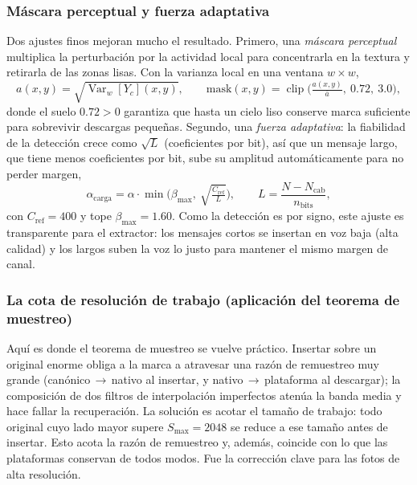 \documentclass[12pt,a4paper]{article}
\begin{document}
\subsubsection*{Máscara perceptual y fuerza adaptativa}
Dos ajustes finos mejoran mucho el resultado. Primero, una \emph{máscara perceptual}
multiplica la perturbación por la actividad local para concentrarla en la textura y
retirarla de las zonas lisas. Con la varianza local en una ventana $w\times w$,
\begin{equation}
a(x,y) = \sqrt{\operatorname{Var}_w[Y_c](x,y)}, \qquad
\mathrm{mask}(x,y) = \operatorname{clip}\!\Big(\tfrac{a(x,y)}{\overline{a}},\ 0{.}72,\ 3{.}0\Big),
\end{equation}
donde el suelo $0{.}72>0$ garantiza que hasta un cielo liso conserve marca suficiente para
sobrevivir descargas pequeñas. Segundo, una \emph{fuerza adaptativa}: la fiabilidad de la
detección crece como $\sqrt{L}$ (coeficientes por bit), así que un mensaje largo, que tiene
menos coeficientes por bit, sube su amplitud automáticamente para no perder margen,
\begin{equation}
\alpha_{\text{carga}} = \alpha \cdot \min\!\Big(\beta_{\max},\ \sqrt{\tfrac{C_{\text{ref}}}{L}}\Big),
\qquad L = \frac{N-N_{\text{cab}}}{n_{\text{bits}}},
\end{equation}
con $C_{\text{ref}}=400$ y tope $\beta_{\max}=1{.}60$. Como la detección es por signo, este
ajuste es transparente para el extractor: los mensajes cortos se insertan en voz baja (alta
calidad) y los largos suben la voz lo justo para mantener el mismo margen de canal.

\subsubsection*{La cota de resolución de trabajo (aplicación del teorema de muestreo)}
Aquí es donde el teorema de muestreo se vuelve práctico. Insertar sobre un original enorme
obliga a la marca a atravesar una razón de remuestreo muy grande (canónico\,$\to$\,nativo al
insertar, y nativo\,$\to$\,plataforma al descargar); la composición de dos filtros de
interpolación imperfectos atenúa la banda media y hace fallar la recuperación. La solución
es acotar el tamaño de trabajo: todo original cuyo lado mayor supere $S_{\max}=2048$ se
reduce a ese tamaño antes de insertar. Esto acota la razón de remuestreo y, además, coincide
con lo que las plataformas conservan de todos modos. Fue la corrección clave para las fotos
de alta resolución.
\end{document}
